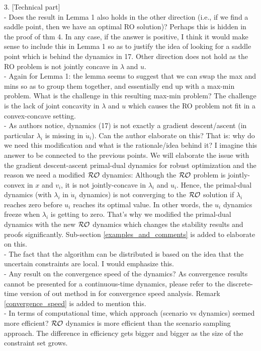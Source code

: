 \documentclass[journal,twoside,web]{ieeecolor}
\begin{document}
3. [Technical part]\\
{\color{red}- Does the result in Lemma 1 also holds in the other direction (i.e., if we find a saddle point, then we have an optimal RO solution)? Perhaps this is hidden in the proof of thm 4. In any case, if the answer is positive, I think it would make sense to include this in Lemma 1 so as to justify the idea of looking for a saddle point which is behind the dynamics in 17.} {\color{blue} Other direction does not hold as the RO problem is not jointly concave in $\lambda$ and $u$.}\\
{\color{red}- Again for Lemma 1: the lemma seems to suggest that we can swap the max and mins so as to group them together, and essentially end up with a max-min problem. What is the challenge in this resulting max-min problem?} {\color{blue} The challenge is the lack of joint concavity in $\lambda$ and $u$ which causes the RO problem not fit in a convex-concave setting.}\\
{\color{red}- As authors notice, dynamics (17) is not exactly a gradient descent/ascent (in particular $\lambda_i$ is missing in $\dot u_i$). Can the author elaborate on this? That is: why do we need this modification and what is the rationale/idea behind it? I imagine this answer to be connected to the previous points.} {\color{blue} We will elaborate the issue with the gradient descent-ascent primal-dual dynamics for robust optimization and the reason we need a modified ${\cal RO}$ dynamics: Although the ${\cal RO}$ problem is jointly-convex in $x$ and $v_i$, it is not jointly-concave in $\lambda_i$ and $u_i$. Hence, the primal-dual dynamics (with $\lambda_i$ in $\dot u_i$ dynamics) is not converging to the $\cal{\cal RO}$ solution if $\lambda_i$ reaches zero before $u_i$ reaches its optimal value. In other words, the $u_i$ dynamics freeze when $\lambda_i$ is getting to zero. That's why we modified the primal-dual dynamics with the new ${\cal RO}$ dynamics which changes the stability results and proofs significantly. Sub-section \ref{examples_and_comments} is added to elaborate on this.}\\
{\color{red}- The fact that the algorithm can be distributed is based on the idea that the uncertain constraints are local. I would emphasize this.}\\
{\color{red}- Any result on the convergence speed of the dynamics?} {\color{blue} As convergence results cannot be presented for a continuous-time dynamics, please refer to the discrete-time version of out method in \cite{ebrahimi2019} for convergence speed analysis. Remark \ref{convergence_speed} is added to mention this.}\\
{\color{red}- In terms of computational time, which approach (scenario vs dynamics)
seemed more efficient?} {\color{blue} ${\cal RO}$ dynamics is more efficient than the scenario sampling approach. The difference in efficiency gets bigger and bigger as the size of the constraint set grows.}
\end{document}
